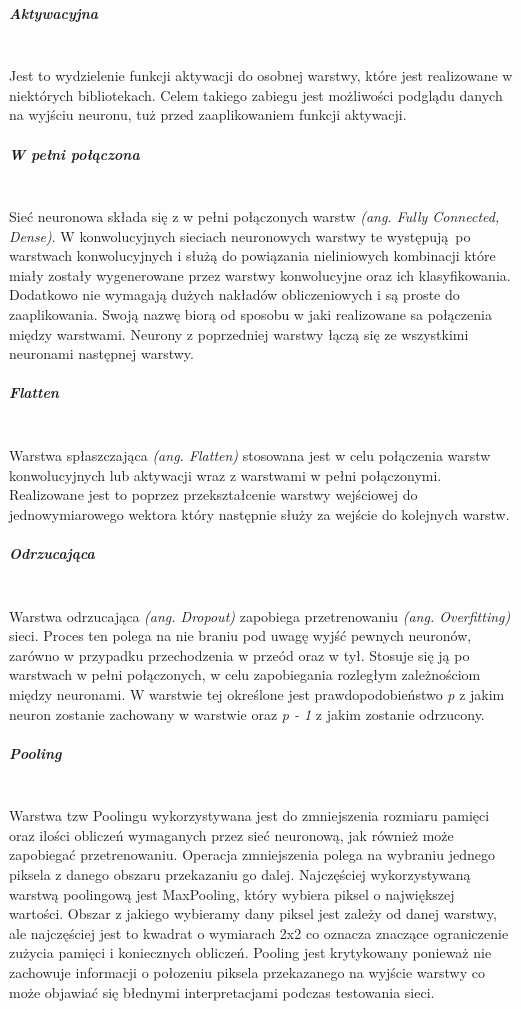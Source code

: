 \subparagraph{Aktywacyjna}  \mbox{}\\
Jest to wydzielenie funkcji aktywacji do osobnej warstwy, które jest realizowane
w niektórych bibliotekach. Celem takiego zabiegu jest możliwości podglądu danych
na wyjściu neuronu, tuż przed zaaplikowaniem funkcji aktywacji.

\subparagraph{W pełni połączona}  \mbox{}\\
Sieć neuronowa składa się z w pełni połączonych warstw \textit{(ang. Fully Connected, Dense)}.
W konwolucyjnych sieciach neuronowych warstwy te występują po warstwach konwolucyjnych
i służą do powiązania nieliniowych kombinacji które miały zostały wygenerowane przez
warstwy konwolucyjne oraz ich klasyfikowania. Dodatkowo nie wymagają dużych nakładów
obliczeniowych i są proste do zaaplikowania. Swoją nazwę biorą od sposobu w jaki
realizowane sa połączenia między warstwami. Neurony z poprzedniej warstwy łączą się ze
wszystkimi neuronami następnej warstwy.

\subparagraph{Flatten}  \mbox{}\\
Warstwa spłaszczająca \textit{(ang. Flatten)} stosowana jest w celu połączenia warstw
konwolucyjnych lub aktywacji wraz z warstwami w pełni połączonymi. Realizowane jest
to poprzez przekształcenie warstwy wejściowej do jednowymiarowego wektora który następnie
służy za wejście do kolejnych warstw.

\subparagraph{Odrzucająca}  \mbox{}\\
Warstwa odrzucająca \textit{(ang. Dropout)} zapobiega przetrenowaniu \textit{(ang. Overfitting)}
sieci. Proces ten polega na nie braniu pod uwagę wyjść pewnych neuronów, zarówno
w przypadku przechodzenia w przeód oraz w tył. Stosuje się ją po warstwach w pełni
połączonych, w celu zapobiegania rozległym zależnościom między neuronami. W warstwie
tej określone jest prawdopodobieństwo \textit{p} z jakim neuron zostanie zachowany
w warstwie oraz \textit{p - 1} z jakim zostanie odrzucony.


\subparagraph{Pooling}  \mbox{}\\
Warstwa tzw Poolingu wykorzystywana jest do zmniejszenia rozmiaru pamięci oraz
ilości obliczeń wymaganych przez sieć neuronową, jak również może zapobiegać przetrenowaniu.
Operacja zmniejszenia polega na wybraniu jednego piksela z danego obszaru przekazaniu
go dalej. Najczęściej wykorzystywaną warstwą poolingową jest MaxPooling, który
wybiera piksel o największej wartości. Obszar z jakiego wybieramy dany piksel jest
zależy od danej warstwy, ale najczęściej jest to kwadrat o wymiarach 2x2 co oznacza
znaczące ograniczenie zużycia pamięci i koniecznych obliczeń. Pooling jest krytykowany
ponieważ nie zachowuje informacji o połozeniu piksela przekazanego na wyjście
warstwy co może objawiać się błednymi interpretacjami podczas testowania sieci.

